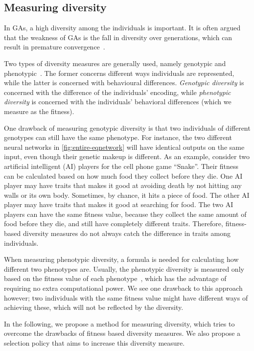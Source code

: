 \subsection{Measuring diversity}
In GAs, a high diversity among the individuals is important. It is often argued that the weakness of GAs is the fall in diversity over generations, which can result in premature convergence~\cite{diaz2007empirical, 1266373,Zitzler00comparisonof}.

Two types of diversity measures are generally used, namely genotypic and phenotypic~\cite{Nguyen:2006:ASPGP,1250187}. The former concerns different ways individuals are represented, while the latter is concerned with behavioural differences. \emph{Genotypic diversity} is concerned with the difference of the individuals' encoding, while \emph{phenotypic diversity} is concerned with the individuals' behavioral differences (which we measure as the fitness).

One drawback of measuring genotypic diversity is that two individuals of different genotypes can still have the same phenotype. For instance, the two different neural networks in \cref{fig:entire-eqnetwork} will have identical outputs on the same input, even though their genetic makeup is different. As an example, consider two artificial intelligent (AI) players for the cell phone game ``Snake''. Their fitness can be calculated based on how much food they collect before they die. One AI player may have traits that makes it good at avoiding death by not hitting any walls or its own body. Sometimes, by chance, it hits a piece of food. The other AI player may have traits that makes it good at searching for food. The two AI players can have the same fitness value, because they collect the same amount of food before they die, and still have completely different traits. Therefore, fitness-based diversity measures do not always catch the difference in traits among individuals.

%

%

When measuring phenotypic diversity, a formula is needed for calculating how different two phenotypes are. Usually, the phenotypic diversity is measured only based on the fitness value of each phenotype~\cite{Nguyen:2006:ASPGP}, which has the advantage of requiring no extra computational power.  We see one drawback to this approach however; two individuals with the same fitness value might have different ways of achieving these, which will not be reflected by the diversity.

In the following, we propose a method for measuring diversity, which tries to overcome the drawbacks of fitness based diversity measures. We also propose a selection policy that aims to increase this diversity measure.
